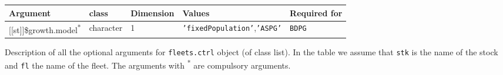 \begin{landscape}
\begin{table}[!ht]
\begin{footnotesize}
\begin{threeparttable}
      \begin{tabular}{lllll} %
        \hline 
        Argument & class & Dimension & Values & Required for \\
        \hline
        {[[st]]}\$growth.model\textsuperscript{*} & character & 1 & \texttt{'fixedPopulation'},\texttt{'ASPG'} & \texttt{BDPG}  \\
        \hline
      \end{tabular}
      
    \end{threeparttable}
  \end{footnotesize}

\end{table}


\begin{table}[!ht]

  \centering
  \begin{footnotesize}
    
    \caption{Description of all the optional arguments for \texttt{fleets.ctrl} object (of class list).
    In the table we assume that \texttt{stk} is the name of the stock and \texttt{fl} the name of the fleet.
    The arguments with \textsuperscript{*} are compulsory arguments.}
    
    \label{tb:A3.table3}
    
    \begin{threeparttable}
    

\end{threeparttable}
\end{footnotesize}
\end{table}
\end{landscape}
